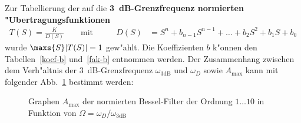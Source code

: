 \nit Zur Tabellierung der auf die {\bf 3~dB-Grenzfrequenz normierten
"Ubertragungsfunktionen}
\begin{eqnarray*}
T(S)=\frac{K}{D(S)} \qquad \text{mit}\qquad &D(S)&=S^{n}+b_{n-1}S^{n-1}+ \ldots + b_{2}S^{2}+b_{1}S+b_{0} 
\end{eqnarray*}
wurde $\maxs{S}|T(S)|=1$ gew"ahlt. Die Koeffizienten $b$ k"onnen den
Tabellen~\ref{koef-b} und~\ref{fak-b} entnommen werden.  Der
Zusammenhang zwischen dem Verh"altnis der 3~dB-Grenz\-frequenz $\omega_{\text{3dB}}$ und
$\omega_{D}$ sowie $A_{\max}$ kann
mit folgender Abb.~\ref{gb} bestimmt werden:\\


\clearpage

\begin{figure}[!htb]%
\vspace*{-1mm}
\begin{center}
  \vspace*{-3mm}\caption{Graphen $A_{\max}$ der normierten Bessel-Filter der Ordnung $1\ldots 10$ in Funktion von $\Omega=\omega_D/\omega_{\text{3dB}}$ \label{gb}}
\end{center}
\vspace*{-6mm}
\end{figure}


